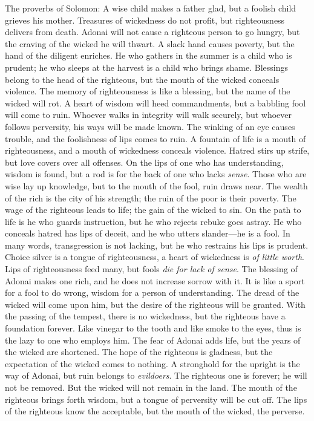 \begin{biblechapter} %
 The proverbs of Solomon: 
A wise child makes a father glad, 
but a foolish child grieves his mother.
\verse Treasures of wickedness do not profit, 
but righteousness delivers from death.
\verse Adonai will not cause a righteous person to go hungry, 
but the craving of the wicked he will thwart.
\verse A slack hand causes poverty, 
but the hand of the diligent enriches.
\verse He who gathers in the summer is a child who is prudent; 
he who sleeps at the harvest is a child who brings shame.
\verse Blessings belong to the head of the righteous, 
but the mouth of the wicked conceals violence.
\verse The memory of righteousness is like a blessing, 
but the name of the wicked will rot.
\verse A heart of wisdom will heed commandments, 
but a babbling fool will come to ruin.
\verse Whoever walks in integrity will walk securely, 
but whoever follows perversity, his ways will be made known.
\verse The winking of an eye causes trouble, 
and the foolishness of lips comes to ruin.
\verse A fountain of life is a mouth of righteousness, 
and a mouth of wickedness conceals violence.
\verse Hatred stirs up strife, 
but love covers over all offenses.
\verse On the lips of one who has understanding, wisdom is found, 
but a rod is for the back of one who lacks \textit{sense}.
\verse Those who are wise lay up knowledge, 
but to the mouth of the fool, ruin draws near.
\verse The wealth of the rich is the city of his strength; 
the ruin of the poor is their poverty.
\verse The wage of the righteous leads to life; 
the gain of the wicked to sin.
\verse On the path to life is he who guards instruction, 
but he who rejects rebuke goes astray.
\verse He who conceals hatred has lips of deceit, 
and he who utters slander—he is a fool.
\verse In many words, transgression is not lacking, 
but he who restrains his lips is prudent.
\verse Choice silver is a tongue of righteousness, 
a heart of wickedness is \textit{of little worth}.
\verse Lips of righteousness feed many, 
but fools \textit{die for lack of sense}.
\verse The blessing of Adonai makes one rich, 
and he does not increase sorrow with it.
\verse It is like a sport for a fool to do wrong, 
wisdom for a person of understanding.
\verse The dread of the wicked will come upon him, 
but the desire of the righteous will be granted.
\verse With the passing of the tempest, there is no wickedness, 
but the righteous have a foundation forever.
\verse Like vinegar to the tooth and like smoke to the eyes, 
thus is the lazy to one who employs him.
\verse The fear of Adonai adds life, 
but the years of the wicked are shortened.
\verse The hope of the righteous is gladness, 
but the expectation of the wicked comes to nothing.
\verse A stronghold for the upright is the way of Adonai, 
but ruin belongs to \textit{evildoers}.
\verse The righteous one is forever; he will not be removed. 
But the wicked will not remain in the land.
\verse The mouth of the righteous brings forth wisdom, 
but a tongue of perversity will be cut off.
\verse The lips of the righteous know the acceptable, 
but the mouth of the wicked, the perverse.
\end{biblechapter}


